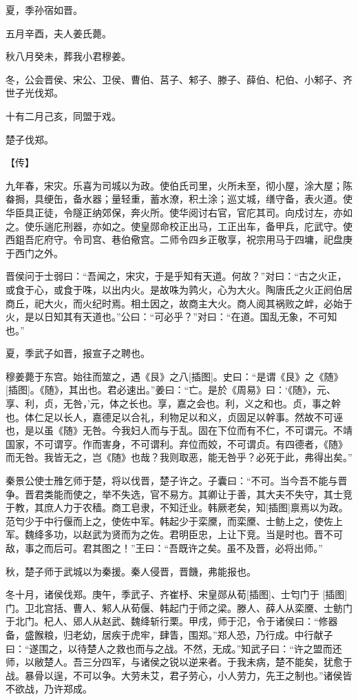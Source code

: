 \documentclass[a4paper,12pt,UTF8,twoside]{ctexbook}
\begin{document}
夏，季孙宿如晋。

五月辛酉，夫人姜氏薨。

秋八月癸未，葬我小君穆姜。

冬，公会晋侯、宋公、卫侯、曹伯、莒子、邾子、滕子、薛伯、杞伯、小邾子、齐世子光伐郑。

十有二月己亥，同盟于戏。

楚子伐郑。

【传】

九年春，宋灾。乐喜为司城以为政。使伯氏司里，火所未至，彻小屋，涂大屋；陈畚挶，具绠缶，备水器；量轻重，蓄水潦，积土涂；巡丈城，缮守备，表火道。使华臣具正徒，令隧正纳郊保，奔火所。使华阅讨右官，官庀其司。向戍讨左，亦如之。使乐遄庀刑器，亦如之。使皇郧命校正出马，工正出车，备甲兵，庀武守。使西鉏吾庀府守。令司宫、巷伯儆宫。二师令四乡正敬享，祝宗用马于四墉，祀盘庚于西门之外。

晋侯问于士弱曰：“吾闻之，宋灾，于是乎知有天道。何故？”对曰：“古之火正，或食于心，或食于咮，以出内火。是故咮为鹑火，心为大火。陶唐氏之火正阏伯居商丘，祀大火，而火纪时焉。相土因之，故商主大火。商人阅其祸败之衅，必始于火，是以日知其有天道也。”公曰：“可必乎？”对曰：“在道。国乱无象，不可知也。”

夏，季武子如晋，报宣子之聘也。

穆姜薨于东宫。始往而筮之，遇《艮》之八[插图]。史曰：“是谓《艮》之《随》[插图]。《随》，其出也。君必速出。”姜曰：“亡。是於《周易》曰：‘《随》，元、享、利，贞，无咎，’元，体之长也。享，嘉之会也。利，义之和也。贞，事之幹也。体仁足以长人，嘉德足以合礼，利物足以和义，贞固足以幹事。然故不可诬也，是以虽《随》无咎。今我妇人而与于乱。固在下位而有不仁，不可谓元。不靖国家，不可谓亨。作而害身，不可谓利。弃位而姣，不可谓贞。有四德者，《随》而无咎。我皆无之，岂《随》也哉？我则取恶，能无咎乎？必死于此，弗得出矣。”

秦景公使士雃乞师于楚，将以伐晋，楚子许之。子囊曰：“不可。当今吾不能与晋争。晋君类能而使之，举不失选，官不易方。其卿让于善，其大夫不失守，其士竞于教，其庶人力于农穑。商工皂隶，不知迁业。韩厥老矣，知[插图]禀焉以为政。范匄少于中行偃而上之，使佐中军。韩起少于栾黡，而栾黡、士鲂上之，使佐上军。魏绛多功，以赵武为贤而为之佐。君明臣忠，上让下竞。当是时也。晋不可敌，事之而后可。君其图之！”王曰：“吾既许之矣。虽不及晋，必将出师。”

秋，楚子师于武城以为秦援。秦人侵晋，晋饑，弗能报也。

冬十月，诸侯伐郑。庚午，季武子、齐崔杼、宋皇郧从荀[插图]、士匄门于 [插图]门。卫北宫括、曹人、邾人从荀偃、韩起门于师之梁。滕人、薛人从栾黡、士鲂门于北门。杞人、郳人从赵武、魏绛斩行栗。甲戌，师于氾，令于诸侯曰：“修器备，盛餱粮，归老幼，居疾于虎牢，肆眚，围郑。”郑人恐，乃行成。中行献子曰：“遂围之，以待楚人之救也而与之战。不然，无成。”知武子曰：“许之盟而还师，以敝楚人。吾三分四军，与诸侯之锐以逆来者。于我未病，楚不能矣，犹愈于战。暴骨以逞，不可以争。大劳未艾，君子劳心，小人劳力，先王之制也。”诸侯皆不欲战，乃许郑成。
\end{document}
